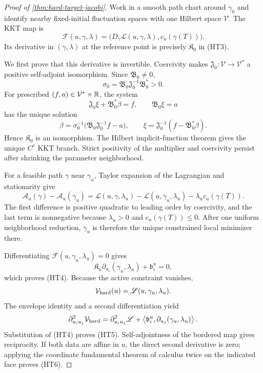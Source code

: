\begin{proof}[Proof of \cref{thm:hard-target-jacobi}]
Work in a smooth path chart around \(\gamma_0\) and identify nearby
fixed-initial fluctuation spaces with one Hilbert space \(\mathcal V\).  The
KKT map is
\[
  \mathscr F(u,\gamma,\lambda)
  =\bigl(D_\gamma\mathscr L(u,\gamma,\lambda),
  c_u(\gamma(T))\bigr).
\]
Its derivative in \((\gamma,\lambda)\) at the reference point is precisely
\(\mathfrak K_0\) in \textup{(HT3)}.

We first prove that this derivative is invertible.  Coercivity makes
\(\mathfrak J_0:\mathcal V\to\mathcal V^*\) a positive self-adjoint
isomorphism.  Since \(\mathfrak B_0\ne0\),
\[
  \sigma_0
  =\mathfrak B_0\mathfrak J_0^{-1}\mathfrak B_0^*>0.
\]
For prescribed \((f,a)\in\mathcal V^*\times\mathbb R\), the system
\[
  \mathfrak J_0\xi+\mathfrak B_0^*\beta=f,
  \qquad \mathfrak B_0\xi=a
\]
has the unique solution
\[
  \beta=\sigma_0^{-1}
  \bigl(\mathfrak B_0\mathfrak J_0^{-1}f-a\bigr),
  \qquad
  \xi=\mathfrak J_0^{-1}(f-\mathfrak B_0^*\beta).
\]
Hence \(\mathfrak K_0\) is an isomorphism.  The Hilbert implicit-function
theorem gives the unique \(C^r\) KKT branch.  Strict positivity of the
multiplier and coercivity persist after shrinking the parameter
neighborhood.

For a feasible path \(\gamma\) near \(\gamma_u\), Taylor expansion of the
Lagrangian and stationarity give
\[
  \mathcal A_u(\gamma)-\mathcal A_u(\gamma_u)
  =\mathscr L(u,\gamma,\lambda_u)
   -\mathscr L(u,\gamma_u,\lambda_u)
   -\lambda_u c_u(\gamma(T)).
\]
The first difference is positive quadratic to leading order by coercivity,
and the last term is nonnegative because \(\lambda_u>0\) and
\(c_u(\gamma(T))\le0\).  After one uniform neighborhood reduction,
\(\gamma_u\) is therefore the unique constrained local minimizer there.

Differentiating \(\mathscr F(u,\gamma_u,\lambda_u)=0\) gives
\[
  \mathfrak K_u\partial_{u_i}(\gamma_u,\lambda_u)
  +\mathfrak b_i^u=0,
\]
which proves \textup{(HT4)}.  Because the active constraint vanishes,
\[
  \mathcal V_{\rm hard}(u)
  =\mathscr L(u,\gamma_u,\lambda_u).
\]
The envelope identity and a second differentiation yield
\[
  \partial_{u_i u_j}^2\mathcal V_{\rm hard}
  =\partial_{u_i u_j}^2\mathscr L
  +\left\langle
  \mathfrak b_i^u,\partial_{u_j}(\gamma_u,\lambda_u)
  \right\rangle.
\]
Substitution of \textup{(HT4)} proves \textup{(HT5)}.  Self-adjointness of
the bordered map gives reciprocity.  If both data are affine in \(u\), the
direct second derivative is zero; applying the coordinate fundamental theorem
of calculus twice on the indicated face proves \textup{(HT6)}.
\end{proof}

